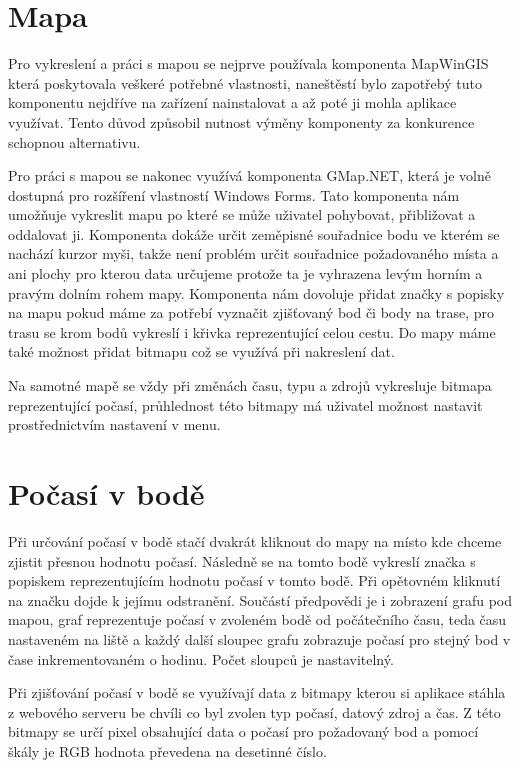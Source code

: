 \documentclass[czech,bachelor,dept460,male,csharp,cpdeclaration]{diploma}
\begin{document}
	\section{Mapa}
	
	Pro vykreslení a práci s mapou se nejprve používala komponenta MapWinGIS která poskytovala veškeré potřebné vlastnosti, naneštěstí bylo zapotřebý tuto komponentu nejdříve na zařízení nainstalovat a až poté ji mohla aplikace využívat. Tento důvod způsobil nutnost výměny komponenty za konkurence schopnou alternativu.
	
	Pro práci s mapou se nakonec využívá komponenta GMap.NET, která je volně dostupná pro rozšíření vlastností Windows Forms. Tato komponenta nám umožňuje vykreslit mapu po které se může uživatel pohybovat, přibližovat a oddalovat ji. Komponenta dokáže určit zeměpisné souřadnice bodu ve kterém se nachází kurzor myši, takže není problém určit souřadnice požadovaného místa a ani plochy pro kterou data určujeme protože ta je vyhrazena levým horním a pravým dolním rohem mapy. Komponenta nám dovoluje přidat značky s popisky na mapu pokud máme za potřebí vyznačit zjišťovaný bod či body na trase, pro trasu se krom bodů vykreslí i křivka reprezentující celou cestu. Do mapy máme také možnost přidat bitmapu což se využívá při nakreslení dat.
	
	Na samotné mapě se vždy při změnách času, typu a zdrojů vykresluje bitmapa reprezentující počasí, průhlednost této bitmapy má uživatel možnost nastavit prostřednictvím nastavení v menu.
	
	\section{Počasí v bodě}
	
	Při určování počasí v bodě stačí dvakrát kliknout do mapy na místo kde chceme zjistit přesnou hodnotu počasí. Následně se na tomto bodě vykreslí značka s popiskem reprezentujícím hodnotu počasí v tomto bodě. Při opětovném kliknutí na značku dojde k jejímu odstranění. Součástí předpovědi je i zobrazení grafu pod mapou, graf reprezentuje počasí v zvoleném bodě od počátečního času, teda času nastaveném na liště a každý další sloupec grafu zobrazuje počasí pro stejný bod v čase inkrementovaném o hodinu. Počet sloupců je nastavitelný.
	
	Při zjišťování počasí v bodě se využívají data z bitmapy kterou si aplikace stáhla z webového serveru be chvíli co byl zvolen typ počasí, datový zdroj a čas. Z této bitmapy se určí pixel obsahující data o počasí pro požadovaný bod a pomocí škály je RGB hodnota převedena na desetinné číslo.
	
\end{document}
